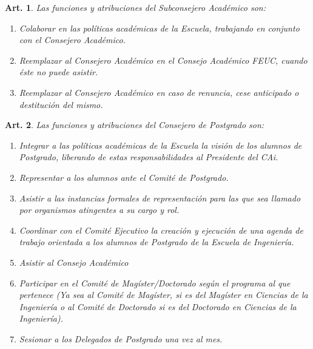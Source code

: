 \documentclass[letterpaper,11pt]{article}
\theoremstyle{plain}
\newtheorem{art}{Art.} %
\begin{document}
		\begin{art}
			Las funciones y atribuciones del Subconsejero Académico son:
			\begin{enumerate}
				\item Colaborar en las políticas académicas de la Escuela, trabajando en conjunto con el Consejero Académico.
				\item Reemplazar al Consejero Académico en el Consejo Académico FEUC, cuando éste no puede asistir.
				\item Reemplazar al Consejero Académico en caso de renuncia, cese anticipado o destitución del mismo.
			\end{enumerate}
		\end{art}

		\begin{art}\label{funcionesCAPostgrado}
			Las funciones y atribuciones del Consejero de Postgrado son:
			\begin{enumerate}
				\item Integrar a las políticas académicas de la Escuela la visión de los alumnos de Postgrado, liberando de estas responsabilidades al Presidente del CAi.
				\item Representar a los alumnos ante el Comité de Postgrado.
				\item Asistir a las instancias formales de representación para las que sea llamado por organismos atingentes a su cargo y rol.
				\item Coordinar con el Comité Ejecutivo la creación y ejecución de una agenda de trabajo orientada a los alumnos de Postgrado de la Escuela de Ingeniería.
				\item Asistir al Consejo Académico
				\item Participar en el Comité de Magíster/Doctorado según el programa al que pertenece (Ya sea al Comité de Magíster, si es del Magíster en Ciencias de la Ingeniería o al Comité de Doctorado si es del Doctorado en Ciencias de la Ingeniería).
				\item Sesionar a los Delegados de Postgrado una vez al mes.
			\end{enumerate}
		\end{art}
\end{document}
